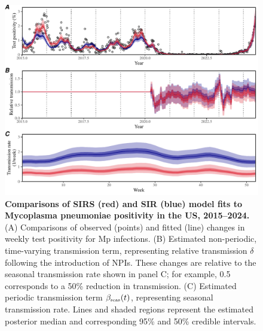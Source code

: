 \documentclass[12pt]{article}
\newcommand{\tsub}[2]{#1_{{\textrm{\tiny #2}}}}
\begin{document}
\pagebreak

\begin{figure}[!ht]
\includegraphics[width=\textwidth]{../figure_sirs/figure_sirs_fit.pdf}
\caption{
\textbf{Comparisons of SIRS (red) and SIR (blue) model fits to Mycoplasma pneumoniae positivity in the US, 2015--2024.}
(A) Comparisons of observed (points) and fitted (line) changes in weekly test positivity for Mp infections.
(B) Estimated non-periodic, time-varying transmission term, representing relative transmission $\delta$ following the introduction of NPIs.
These changes are relative to the seasonal transmission rate shown in panel C;
for example, 0.5 corresponds to a 50\% reduction in transmission.
(C) Estimated periodic transmission term  $\tsub{\beta}{seas}(t)$, representing seasonal transmission rate.
Lines and shaded regions represent the estimated posterior median and corresponding 95\% and 50\% credible intervals.
}
\end{figure}

\pagebreak


\end{document}
